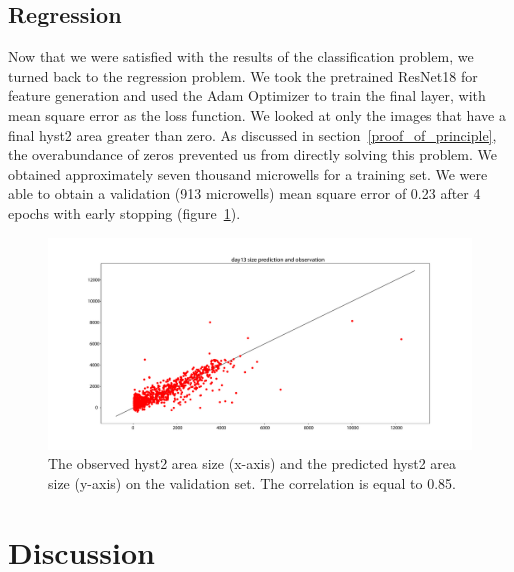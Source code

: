 \documentclass[10pt,twocolumn,letterpaper]{article}
\begin{document}
\subsection{Regression}

Now that we were satisfied with the results of the classification problem, we turned back to the regression problem.  We took the pretrained ResNet18 for feature generation and used the Adam Optimizer to train the final layer, with mean square error as the loss function.  We looked at only the images that have a final hyst2 area greater than zero.  As discussed in section~\ref{proof_of_principle}, the overabundance of zeros prevented us from directly solving this problem.  We obtained approximately seven thousand microwells for a training set.  We were able to obtain a validation (913 microwells) mean square error of 0.23 after 4 epochs with early stopping (figure~\ref{regression_correlation}).


 \begin{figure}[t!]
\begin{center}
 \includegraphics[width=0.9\linewidth]{figures/regression/size_prediction_and_observation_scatter_plot.pdf}
\end{center}
   \caption{The observed hyst2 area size (x-axis) and the predicted hyst2 area size (y-axis) on the validation set.  The correlation is equal to 0.85.}
\label{regression_correlation}
\end{figure}





\section{Discussion}
\end{document}
